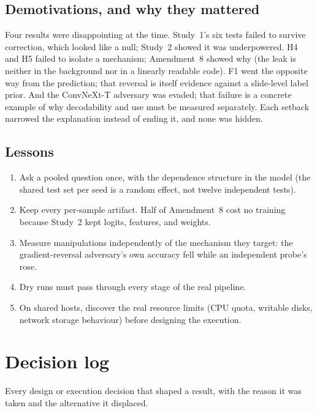 \section{Demotivations, and why they mattered}

Four results were disappointing at the time. Study~1's six tests failed to survive correction, which looked like a null;
Study~2 showed it was underpowered. H4 and H5 failed to isolate a mechanism; Amendment~8 showed why (the leak is neither
in the background nor in a linearly readable code). F1 went the opposite way from the prediction; that reversal is itself
evidence against a slide-level label prior. And the ConvNeXt-T adversary was evaded; that failure is a concrete example
of why decodability and use must be measured separately. Each setback narrowed the explanation instead of ending it, and
none was hidden.

\section{Lessons}

\begin{enumerate}[leftmargin=1.8em]
\item Ask a pooled question once, with the dependence structure in the model (the shared test set per seed is a random
effect, not twelve independent tests).
\item Keep every per-sample artifact. Half of Amendment~8 cost no training because Study~2 kept logits, features, and
weights.
\item Measure manipulations independently of the mechanism they target: the gradient-reversal adversary's own accuracy
fell while an independent probe's rose.
\item Dry runs must pass through every stage of the real pipeline.
\item On shared hosts, discover the real resource limits (CPU quota, writable disks, network storage behaviour) before
designing the execution.
\end{enumerate}

\chapter{Decision log}
\label{r:ch:decisions}

Every design or execution decision that shaped a result, with the reason it was taken and the alternative it displaced.

